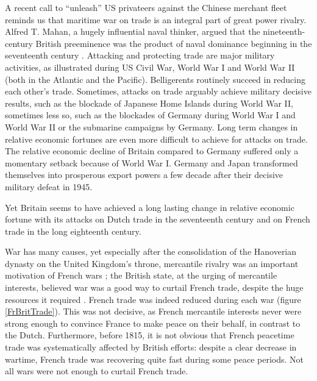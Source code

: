 \documentclass[12pt,a4paper,notitlepage,english]{article}
\begin{document}
A recent call to ``unleash'' US privateers against the Chinese merchant fleet \citep{Cancian2020} reminds us that maritime war on trade is an integral part of great power rivalry.
Alfred T. Mahan, a hugely influential naval thinker, argued that the nineteenth-century British preeminence was the product of naval dominance beginning in the seventeenth century \citep{Mahan2004,Mahan2016,Mahan2016a}.
Attacking and protecting trade are major military activities, as illustrated during US Civil War, World War I and World War II (both in the Atlantic and the Pacific).
Belligerents routinely succeed in reducing each other's trade.
Sometimes, attacks on trade arguably achieve military decisive results, such as the blockade of Japanese Home Islands during World War II, sometimes less so, such as the blockades of Germany during World War I and World War II or the submarine campaigns by Germany.
Long term changes in relative economic fortunes are even more difficult to achieve for attacks on trade.
The relative economic decline of Britain compared to Germany suffered only a momentary setback because of World War I.
Germany and Japan transformed themselves into prosperous export powers a few decade after their decisive military defeat in 1945.

Yet Britain seems to have achieved a long lasting change in relative economic fortune with its attacks on Dutch trade in the seventeenth century and on French trade in the long eighteenth century.

War has many causes, yet especially after the consolidation of the Hanoverian dynasty on the United Kingdom’s throne, mercantile rivalry was an important motivation of French wars \citep{Wallerstein1980, Tracy1991, Davis2006, Crouzet2008}; the British state, at the urging of mercantile interests, believed war was a good way to curtail French trade, despite the huge resources it required \citep{Baugh1965, Neal1977, Brewer2002}.
French trade was indeed reduced during each war (figure \ref{FrBritTrade}).
This was not decisive, as French mercantile interests never were strong enough to convince France to make peace on their behalf, in contrast to the Dutch.
Furthermore, before 1815, it is not obvious that French peacetime trade was systematically affected by British efforts: despite a clear decrease in wartime, French trade was recovering quite fast during some peace periods.
Not all wars were not enough to curtail French trade.
\end{document}
